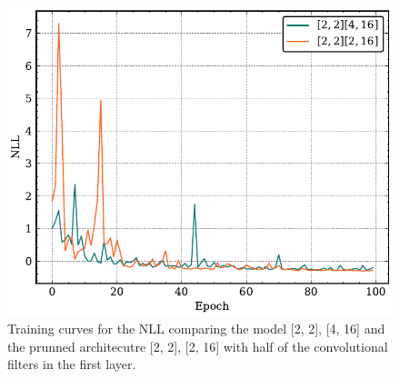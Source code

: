 \begin{figure}
    \centering
    \includegraphics[width=0.9\linewidth]{img/ML/NLL_diff_channels.pdf}
    \caption{Training curves for the NLL comparing the model [2, 2], [4, 16] and the prunned architecutre [2, 2], [2, 16] with half of the convolutional filters in the first layer.}
    \label{fig: pruned NLL}
\end{figure}